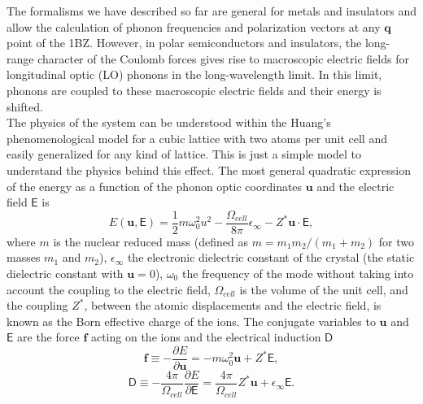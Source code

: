 The formalisms we have described so far are general for metals and insulators and allow the calculation of phonon 
frequencies and polarization vectors at any $\mathbf{q}$ point of the 1BZ. However, in polar semiconductors and 
insulators, the long-range character of the Coulomb forces gives rise to macroscopic electric fields for longitudinal 
optic (LO) phonons in the long-wavelength limit. In this limit, phonons are coupled to these macroscopic electric 
fields and their energy is shifted. \\

The physics of the system can be understood within the Huang's phenomenological model\cite{born1954dynamical} for a cubic lattice with two atoms per unit cell and easily generalized for any kind of lattice. This is 
just a simple model to understand the physics behind this effect. The most general quadratic expression of the energy as a function of the phonon optic coordinates $\mathbf{u}$ and the electric field $\boldsymbol{\mathsf{E}}$ is
\begin{equation}
 E(\mathbf{u},\boldsymbol{\mathsf{E}})=\frac{1}{2}m\omega_{0}^{2}u^{2}-\frac{\Omega_{cell}}{8\pi}\epsilon_{\infty}-Z^{*}\mathbf{u}\cdot\boldsymbol{\mathsf{E}},
\end{equation}  
where $m$ is the nuclear reduced mass (defined as $m=m_{1}m_{2}/(m_{1}+m_{2})$ for two masses $m_{1}$ and $m_{2}$), $\epsilon_{\infty}$ the electronic dielectric constant of the crystal (the static dielectric constant 
with $\mathbf{u}=0$), $\omega_{0}$ the frequency of the mode without taking into account the coupling to the electric field, $\Omega_{cell}$ is the volume of the unit cell, and the coupling $Z^{*}$, between the atomic 
displacements and the electric field, is known as the Born effective charge of the ions. The conjugate variables to $\mathbf{u}$ and $\boldsymbol{\mathsf{E}}$ are the force $\mathbf{f}$ acting on the ions and the electrical 
induction $\boldsymbol{\mathsf{D}}$
\begin{equation}
 \label{conjugate-force}
 \mathbf{f}\equiv -\frac{\partial E}{\partial\mathbf{u}}=-m\omega_{0}^{2}\mathbf{u}+Z^{*}\boldsymbol{\mathsf{E}},
\end{equation}
\begin{equation}
 \label{conjugate-field}
	\boldsymbol{\mathsf{D}}\equiv -\frac{4\pi}{\Omega_{cell}}\frac{\partial E}{\partial \boldsymbol{\mathsf{E}}}=\frac{4\pi}{\Omega_{cell}}Z^{*}\mathbf{u}+\epsilon_{\infty}\boldsymbol{\mathsf{E}}.
\end{equation}

